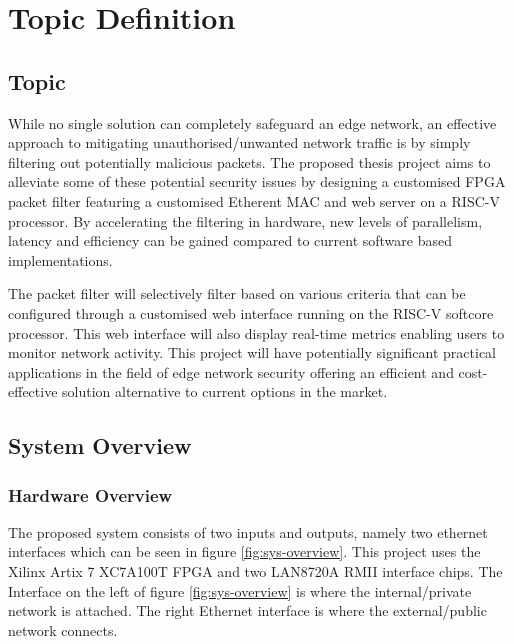 \chapter[Topic Definition]{Topic Definition}
\label{Chap:label}	%
\pagestyle{headings}


\section{Topic}





While no single solution can completely safeguard an edge network, an effective approach to mitigating unauthorised/unwanted network 
traffic is by simply filtering out potentially malicious packets. The proposed thesis project aims to alleviate some of these potential security issues by 
designing a customised FPGA packet filter featuring a customised Etherent MAC and web server on a RISC-V processor.  By accelerating the filtering in hardware, 
new levels of parallelism, latency and efficiency can be gained compared to current software based implementations. 

The packet filter will selectively filter based on various 
criteria that can be configured through a customised web interface running on the RISC-V softcore processor. This web interface will also display real-time metrics enabling users to monitor network activity. This project will have potentially significant practical applications in the field of edge network security offering an efficient and cost-effective solution alternative to current options in the market.


\section{System Overview}
\subsection{Hardware Overview}

The proposed system consists of two inputs and outputs, namely two ethernet interfaces which can be seen in figure \ref{fig:sys-overview}. This project uses the 
Xilinx Artix 7 XC7A100T FPGA and two LAN8720A RMII interface chips. The Interface on the left of figure \ref{fig:sys-overview} is where the internal/private 
network is attached. The right Ethernet interface is where the external/public network connects. 

